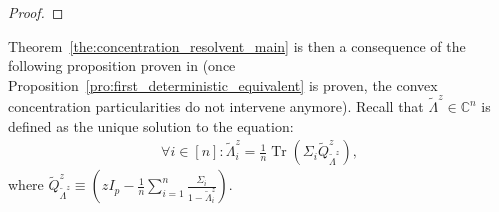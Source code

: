 \documentclass{ws-rmta}
\DeclareMathOperator{\tr}{Tr}
\begin{document}
\begin{proof}
\end{proof}

 Theorem~\ref{the:concentration_resolvent_main} is then a consequence of the following proposition proven in \cite{LOU21RHL} (once Proposition~\ref{pro:first_deterministic_equivalent} is proven, the convex concentration particularities do not intervene anymore). Recall that $\tilde \Lambda^z \in \mathbb C^n$ is defined as the unique solution to the equation:
 \begin{align*}
   \forall i\in [n]: \tilde \Lambda^z_i = \frac{1}{n} \tr \left(\Sigma_i \tilde Q^z_{\tilde \Lambda^z} \right),
 \end{align*}
 where $\tilde Q^z_{\tilde \Lambda^z} \equiv \left( zI_p - \frac{1}{n}\sum_{i=1}^n \frac{\Sigma_i}{1 - \tilde \Lambda_i^z} \right)$.
\end{document}
